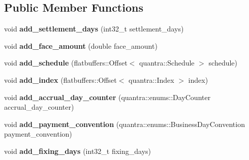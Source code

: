 \subsection*{Public Member Functions}
\begin{DoxyCompactItemize}
\item 
\mbox{\label{structquantra_1_1FloatingRateBondBuilder_a3800c5c9b935d4a7b9c9b73017997b31}} 
void {\bfseries add\+\_\+settlement\+\_\+days} (int32\+\_\+t settlement\+\_\+days)
\item 
\mbox{\label{structquantra_1_1FloatingRateBondBuilder_a6de393ecdcdc3a12b123286d26493998}} 
void {\bfseries add\+\_\+face\+\_\+amount} (double face\+\_\+amount)
\item 
\mbox{\label{structquantra_1_1FloatingRateBondBuilder_a05342943e850d1993d7dfc80e1c65ce5}} 
void {\bfseries add\+\_\+schedule} (flatbuffers\+::\+Offset$<$ quantra\+::\+Schedule $>$ schedule)
\item 
\mbox{\label{structquantra_1_1FloatingRateBondBuilder_a56ad36f960fd41420cf58ef42503dbef}} 
void {\bfseries add\+\_\+index} (flatbuffers\+::\+Offset$<$ quantra\+::\+Index $>$ index)
\item 
\mbox{\label{structquantra_1_1FloatingRateBondBuilder_ae9f691f5623bcc86b9efefc6d7d2a41c}} 
void {\bfseries add\+\_\+accrual\+\_\+day\+\_\+counter} (quantra\+::enums\+::\+Day\+Counter accrual\+\_\+day\+\_\+counter)
\item 
\mbox{\label{structquantra_1_1FloatingRateBondBuilder_a602e5ff7ec78cddd2bf69ff1bf92dd12}} 
void {\bfseries add\+\_\+payment\+\_\+convention} (quantra\+::enums\+::\+Business\+Day\+Convention payment\+\_\+convention)
\item 
\mbox{\label{structquantra_1_1FloatingRateBondBuilder_ae8304a49d239526161bbc2e1416dcdf7}} 
void {\bfseries add\+\_\+fixing\+\_\+days} (int32\+\_\+t fixing\+\_\+days)
\item 
\mbox{\label{structquantra_1_1FloatingRateBondBuilder_a6479cf63ab42965017328f0e07b71cd0}} 

\end{DoxyCompactItemize}
